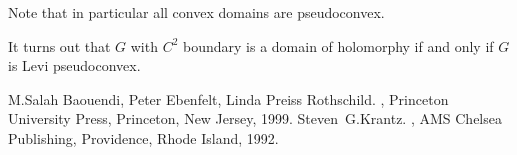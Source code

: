 \documentclass[12pt]{article}
\theoremstyle{theorem}
\theoremstyle{definition}
\begin{document}
Note that in particular all convex domains are pseudoconvex.

It turns out that $G$ with $C^2$ boundary is a domain of holomorphy
if and only if
$G$ is Levi pseudoconvex.

\begin{thebibliography}{9}
M.\@ Salah Baouendi,
Peter Ebenfelt,
Linda Preiss Rothschild.
{\em {}},
Princeton University Press,
Princeton, New Jersey, 1999.
Steven~G.\@ Krantz.
{\em {}},
AMS Chelsea Publishing, Providence, Rhode Island, 1992.
\end{thebibliography}
\end{document}

